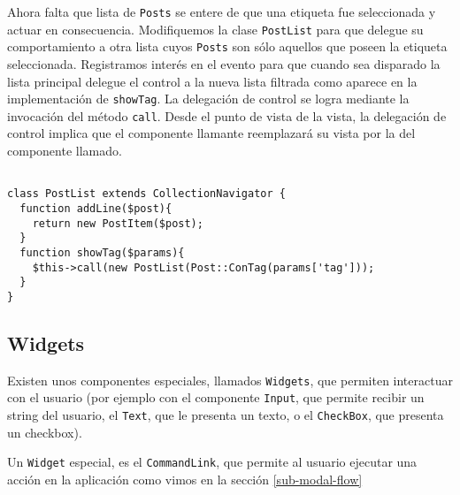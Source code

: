Ahora falta que lista de \verb"Posts" se entere de que una etiqueta fue seleccionada y actuar en consecuencia. Modifiquemos la clase \verb"PostList" para que delegue su comportamiento a otra lista cuyos \verb"Posts" son sólo aquellos que poseen la etiqueta seleccionada. Registramos interés en el evento para que cuando sea disparado la lista principal delegue el control a la nueva lista filtrada como aparece en la implementación de \verb"showTag". La delegación de control se logra mediante la invocación del método \verb"call". Desde el punto de vista de la vista, la delegación de control implica que el componente llamante reemplazará su vista por la del componente llamado.

\begin{verbatim}

class PostList extends CollectionNavigator {
  function addLine($post){
    return new PostItem($post);
  }
  function showTag($params){
    $this->call(new PostList(Post::ConTag(params['tag']));
  }
}

\end{verbatim}






\subsection{Widgets}
\label{sub-widget}

Existen unos componentes especiales, llamados \verb"Widgets"\cite{WDGTS}, que permiten interactuar con el usuario (por ejemplo con el componente \verb"Input", que permite recibir un string del usuario, el \verb"Text", que le presenta un texto, o el \verb"CheckBox", que presenta un checkbox).

Un \verb"Widget" especial, es el \verb"CommandLink", que permite al usuario ejecutar una acción en la aplicación como vimos en la sección \ref{sub-modal-flow}

